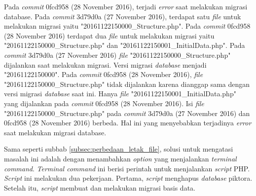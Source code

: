 Pada \textit{commit} 0fcd958 (28 November 2016), terjadi \textit{error} saat melakukan migrasi database. Pada \textit{commit} 3d79d0a (27 November 2016), terdapat satu \textit{file} untuk melakukan migrasi yaitu "20161122150000\_Structure.php". Pada \textit{commit} 0fcd958 (28 November 2016) terdapat dua \textit{file} untuk melakukan migrasi yaitu "20161122150000\_Structure.php" dan "20161122150001\_InitialData.php". Pada \textit{commit} 3d79d0a (27 November 2016) \textit{file} "20161122150000\_Structure.php" dijalankan saat melakukan migrasi. Versi migrasi \textit{database} menjadi "20161122150000". Pada \textit{commit} 0fcd958 (28 November 2016), \textit{file} "20161122150000\_Structure.php" tidak dijalankan karena dianggap sama dengan versi migrasi \textit{database} saat ini. Hanya \textit{file} "20161122150001\_InitialData.php" yang dijalankan pada \textit{commit} 0fcd958 (28 November 2016). Isi \textit{file} "20161122150000\_Structure.php" pada \textit{commit} 3d79d0a (27 November 2016) dan 0fcd958 (28 November 2016) berbeda. Hal ini yang menyebabkan terjadinya \textit{error} saat melakukan migrasi database.  

Sama seperti subbab \ref{subsec:perbedaan_letak_file}, solusi untuk mengatasi masalah ini adalah dengan menambahkan \textit{option} yang menjalankan \textit{terminal command}. \textit{Terminal command} ini berisi perintah untuk menjalankan \textit{script} PHP. \textit{Script} ini melakukan dua pekerjaan. Pertama, \textit{script} menghapus \textit{database} piktora. Setelah itu, \textit{script} membuat dan melakukan migrasi basis data. 
 
